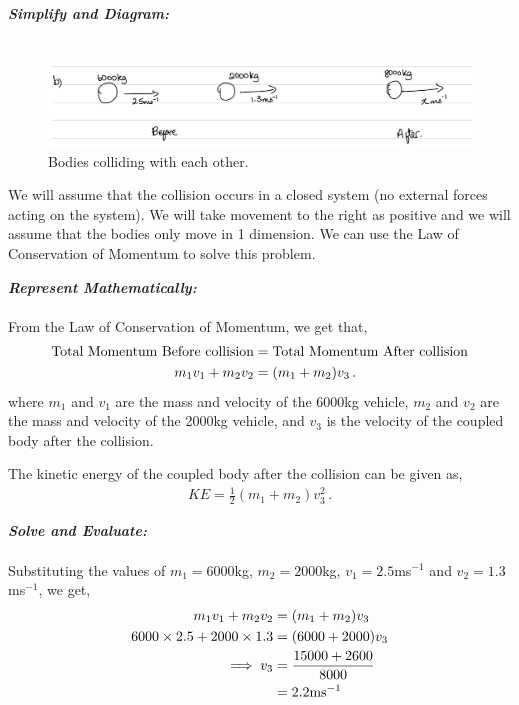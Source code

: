 \begin{subquestions}
\begin{subsubquestions}
\textbf{\textit{Simplify and Diagram:}} \\ \\ 
\begin{figure}[H]
	\begin{center}
		\includegraphics[scale=0.25]{../2008/figures/2008Jq5-1}
		\caption{\label{2008J:q5:Diagram1} Bodies colliding with each other.}
	\end{center}
\end{figure}	
We will assume that the collision occurs in a closed system (no external forces acting on the system). We will take movement to the right as positive and we will assume that the bodies only move in 1 dimension. We can use the Law of Conservation of Momentum to solve this problem.




\textbf{\textit{Represent Mathematically:}} \\ \\
From the Law of Conservation of Momentum, we get that,
\begin{align}
	\text{Total Momentum Before collision} & = \text{Total Momentum After collision} \nonumber \\
	m_1v_1 + m_2v_2 & = (m_1+m_2)v_3 \,.
\end{align}
where $m_1$ and $v_1$ are the mass and velocity of the 6000kg vehicle, $m_2$ and $v_2$ are the mass and velocity of the 2000kg vehicle, and $v_3$ is the velocity of the coupled body after the collision.

The kinetic energy of the coupled body after the collision can be given as,
\begin{align}
	KE = \frac{1}{2}(m_1+m_2)v_3^2 \,.
\end{align}


\textbf{\textit{Solve and Evaluate:}} \\ \\
Substituting the values of $m_1=6000$kg, $m_2=2000$kg, $v_1=2.5$ms$^{-1}$ and $v_2=1.3$ms$^{-1}$, we get, 
\begin{align}
	m_1v_1 + m_2v_2 & = (m_1+m_2)v_3 \nonumber \\
	6000\times2.5 + 2000\times1.3 & = (6000+2000)v_3 \nonumber \\
	\implies v_3 & = \frac{15000+2600}{8000} \nonumber \\
	& = 2.2\text{ms}^{-1}
\end{align}


\end{subsubquestions}
\end{subquestions}
